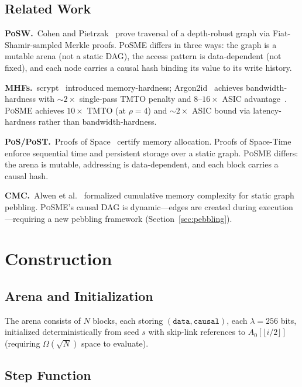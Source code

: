 \documentclass[conference,twocolumn]{IEEEtran}
\newcommand{\posme}{\textsc{PoSME}}
\begin{document}
\subsection{Related Work}

\textbf{PoSW.}~Cohen and Pietrzak~\cite{cohen2018posw} prove
traversal of a depth-robust graph via Fiat-Shamir-sampled Merkle
proofs. \posme{} differs in three ways: the graph is a mutable
arena (not a static DAG), the access pattern is data-dependent
(not fixed), and each node carries a causal hash binding its value
to its write history.

\textbf{MHFs.}~scrypt~\cite{percival2009} introduced
memory-hardness; Argon2id~\cite{biryukov2016} achieves
bandwidth-hardness with ${\sim}2{\times}$ single-pass TMTO penalty
and $8$--$16{\times}$ ASIC advantage~\cite{ren2017}. \posme{}
achieves $10{\times}$ TMTO (at $\rho{=}4$) and
${\sim}2{\times}$ ASIC bound via latency-hardness rather than
bandwidth-hardness.

\textbf{PoS/PoST.}~Proofs of Space~\cite{dziembowski2015}
certify memory allocation. Proofs of
Space-Time~\cite{cohen2018posw} enforce
sequential time and persistent storage over a static graph.
\posme{} differs: the arena is mutable, addressing is
data-dependent, and each block carries a causal hash.

\textbf{CMC.}~Alwen et al.~\cite{alwen2017} formalized cumulative
memory complexity for static graph pebbling. \posme{}'s causal DAG
is dynamic---edges are created during execution---requiring a new
pebbling framework (Section~\ref{sec:pebbling}).

\section{Construction}

\subsection{Arena and Initialization}

The arena consists of $N$ blocks, each storing
$(\texttt{data}, \texttt{causal})$, each $\lambda{=}256$ bits,
initialized deterministically from seed $s$ with skip-link
references to $A_0[\lfloor i/2 \rfloor]$ (requiring
$\Omega(\sqrt{N})$ space to evaluate).

\subsection{Step Function}
\end{document}
